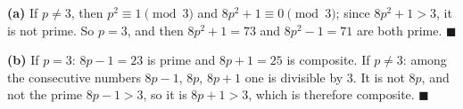 \textbf{(a)} If $p\ne3$, then $p^2\equiv1\pmod3$ and $8p^2+1\equiv0\pmod3$; since $8p^2+1>3$, it is not prime. So $p=3$, and then $8p^2+1=73$ and $8p^2-1=71$ are both prime. $\blacksquare$

\textbf{(b)} If $p=3$: $8p-1=23$ is prime and $8p+1=25$ is composite. If $p\ne3$: among the consecutive numbers $8p-1$, $8p$, $8p+1$ one is divisible by $3$. It is not $8p$, and not the prime $8p-1>3$, so it is $8p+1>3$, which is therefore composite. $\blacksquare$
